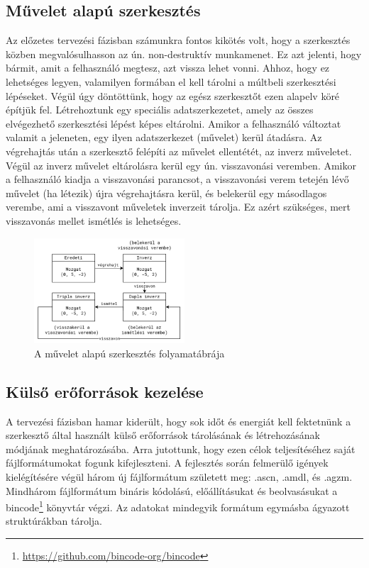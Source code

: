 \pagebreak

\subsection{Művelet alapú szerkesztés}

Az előzetes tervezési fázisban számunkra fontos kikötés volt, hogy a szerkesztés közben
megvalósulhasson az ún. non-destruktív munkamenet. Ez azt jelenti, hogy bármit, amit a felhasználó
megtesz, azt vissza lehet vonni. Ahhoz, hogy ez lehetséges legyen, valamilyen formában el kell
tárolni a múltbeli szerkesztési lépéseket. Végül úgy döntöttünk, hogy az egész szerkesztőt ezen
alapelv köré építjük fel. Létrehoztunk egy speciális adatszerkezetet, amely az összes elvégezhető
szerkesztési lépést képes eltárolni. Amikor a felhasználó változtat valamit a jeleneten, egy
ilyen adatszerkezet (művelet) kerül átadásra. Az végrehajtás után a szerkesztő felépíti az művelet
ellentétét, az inverz műveletet. Végül az inverz művelet eltárolásra kerül egy ún. visszavonási
veremben. Amikor a felhasználó kiadja a visszavonási parancsot, a visszavonási verem tetején lévő
művelet (ha létezik) újra végrehajtásra kerül, és belekerül egy másodlagos verembe, ami a visszavont
műveletek inverzeit tárolja. Ez azért szükséges, mert visszavonás mellet ismétlés is lehetséges.

\begin{figure}[h]
      \centering
      \includegraphics[width=0.5\textwidth]{parts/developer-documentation/editor/images/actions.png}
      \caption{A művelet alapú szerkesztés folyamatábrája}
\end{figure}

\subsection{Külső erőforrások kezelése}

A tervezési fázisban hamar kiderült, hogy sok időt és energiát kell fektetnünk a szerkesztő által
használt külső erőforrások tárolásának és létrehozásának módjának meghatározásába. Arra jutottunk,
hogy ezen célok teljesítéséhez saját fájlformátumokat fogunk kifejleszteni. A fejlesztés során
felmerülő igények kielégítésére végül három új fájlformátum született meg: .ascn, .amdl, és .agzm.
Mindhárom fájlformátum bináris kódolású, előállításukat és beolvasásukat a
bincode\footnote{\url{https://github.com/bincode-org/bincode}}
könyvtár végzi. Az adatokat mindegyik formátum egymásba ágyazott struktúrákban tárolja.

